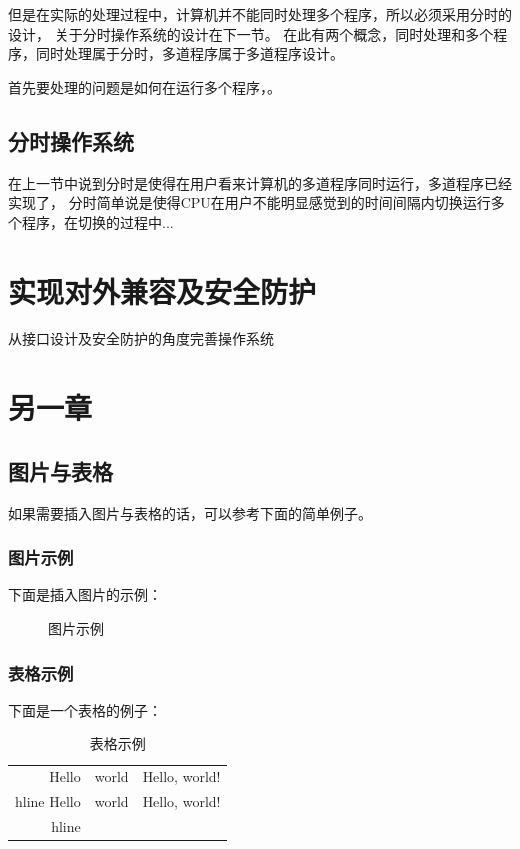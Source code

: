 \documentclass{swfcthesis}
\begin{document}
		但是在实际的处理过程中，计算机并不能同时处理多个程序，所以必须采用分时的设计，
		关于分时操作系统的设计在下一节。
		在此有两个概念，同时处理和多个程序，同时处理属于分时，多道程序属于多道程序设计。

		首先要处理的问题是如何在运行多个程序，。

	\section{分时操作系统}

		在上一节中说到分时是使得在用户看来计算机的多道程序同时运行，多道程序已经实现了，
		分时简单说是使得CPU在用户不能明显感觉到的时间间隔内切换运行多个程序，在切换的过程中...
	
\chapter{实现对外兼容及安全防护}

从接口设计及安全防护的角度完善操作系统


\chapter{另一章}

\section{图片与表格}

如果需要插入图片与表格的话，可以参考下面的简单例子。

\subsection{图片示例}

下面是插入图片的示例：

\begin{figure}[!ht]
  \centering
  \caption{图片示例}
  \label{fig:hello}
\end{figure}

\subsection{表格示例}

下面是一个表格的例子：

\begin{table}[!ht]
  \centering
  \begin{tabular}{|r|c|l|}    \hline
    Hello&world&Hello, world!\\hline
    Hello&world&Hello, world!\\hline
  \end{tabular}
  \caption{表格示例}
\end{table}
\end{document}
